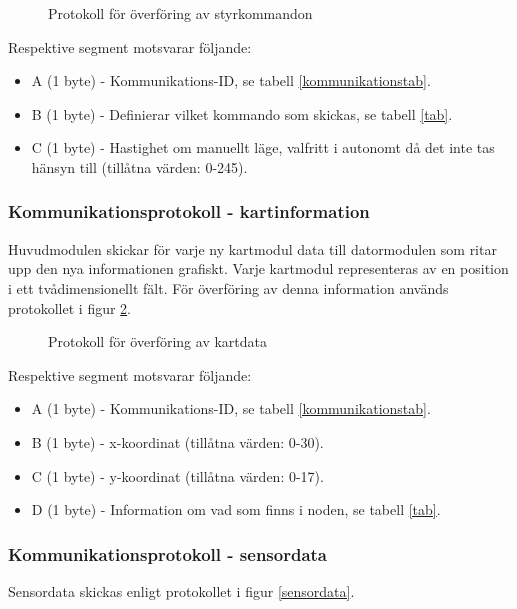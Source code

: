 \documentclass[11pt]{article}
\begin{document}
\begin{flushleft}
\begin{figure}[htbp]
\centering
\noindent\resizebox{.8\linewidth}{!}{
	}
	\caption{Protokoll för överföring av styrkommandon\label{styrdata}}	
\end{figure}

Respektive segment motsvarar följande: 
\begin{itemize}
	\item A (1 byte) - Kommunikations-ID, se tabell \ref{kommunikationstab}.
	\item B (1 byte) - Definierar vilket kommando som skickas, se tabell \ref{tab}.
	\item C (1 byte) - Hastighet om manuellt läge, valfritt i autonomt då det inte tas hänsyn till (tillåtna värden: 0-245).
\end{itemize}

\subsubsection{Kommunikationsprotokoll - kartinformation}
Huvudmodulen skickar för varje ny kartmodul data till datormodulen som ritar upp den nya informationen grafiskt. Varje kartmodul representeras av en position i ett tvådimensionellt fält. För överföring av denna information används protokollet i figur \ref{kartdata}.

\begin{figure}[htbp]
\centering
\noindent\resizebox{.8\linewidth}{!}{
	}
	\caption{Protokoll för överföring av kartdata \label{kartdata}}	
\end{figure}

Respektive segment motsvarar följande: 
\begin{itemize}
	\item A (1 byte) - Kommunikations-ID, se tabell \ref{kommunikationstab}.
	\item B (1 byte) - x-koordinat (tillåtna värden: 0-30).
	\item C (1 byte) - y-koordinat (tillåtna värden: 0-17).
	\item D (1 byte) - Information om vad som finns i noden, se tabell \ref{tab}.
\end{itemize}

\subsubsection{Kommunikationsprotokoll - sensordata}
Sensordata skickas enligt protokollet i figur \ref{sensordata}.


\end{flushleft}
\end{document}
